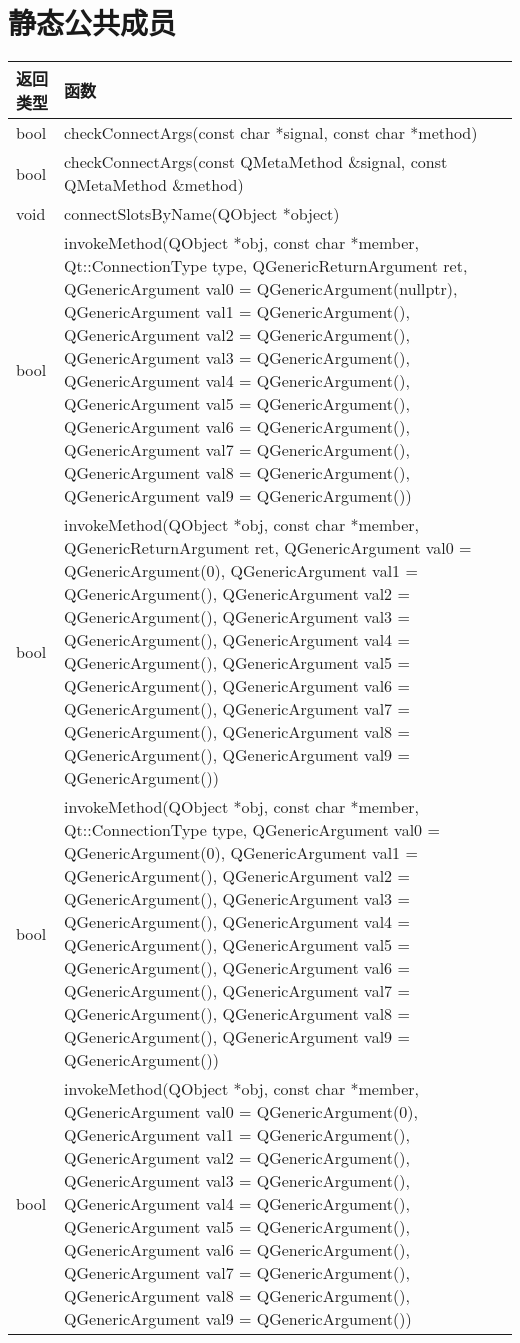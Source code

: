 \section{静态公共成员}

\begin{longtable}[l]{|l|m{28em}|}
\hline
返回类型 &	函数 \\ 
\hline
bool	&checkConnectArgs(const char *signal, const char *method) \\
\hline
bool	&checkConnectArgs(const QMetaMethod \&signal, const QMetaMethod \&method) \\
\hline
void	&connectSlotsByName(QObject *object) \\
\hline
bool	&invokeMethod(QObject *obj, const char *member, Qt::ConnectionType type, QGenericReturnArgument ret, QGenericArgument val0 = QGenericArgument(nullptr), QGenericArgument val1 = QGenericArgument(), QGenericArgument val2 = QGenericArgument(), QGenericArgument val3 = QGenericArgument(), QGenericArgument val4 = QGenericArgument(), QGenericArgument val5 = QGenericArgument(), QGenericArgument val6 = QGenericArgument(), QGenericArgument val7 = QGenericArgument(), QGenericArgument val8 = QGenericArgument(), QGenericArgument val9 = QGenericArgument())\\
\hline
bool	&invokeMethod(QObject *obj, const char *member, QGenericReturnArgument ret, QGenericArgument val0 = QGenericArgument(0), QGenericArgument val1 = QGenericArgument(), QGenericArgument val2 = QGenericArgument(), QGenericArgument val3 = QGenericArgument(), QGenericArgument val4 = QGenericArgument(), QGenericArgument val5 = QGenericArgument(), QGenericArgument val6 = QGenericArgument(), QGenericArgument val7 = QGenericArgument(), QGenericArgument val8 = QGenericArgument(), QGenericArgument val9 = QGenericArgument())\\
\hline
bool	&invokeMethod(QObject *obj, const char *member, Qt::ConnectionType type, QGenericArgument val0 = QGenericArgument(0), QGenericArgument val1 = QGenericArgument(), QGenericArgument val2 = QGenericArgument(), QGenericArgument val3 = QGenericArgument(), QGenericArgument val4 = QGenericArgument(), QGenericArgument val5 = QGenericArgument(), QGenericArgument val6 = QGenericArgument(), QGenericArgument val7 = QGenericArgument(), QGenericArgument val8 = QGenericArgument(), QGenericArgument val9 = QGenericArgument())\\
\hline
bool	&invokeMethod(QObject *obj, const char *member, QGenericArgument val0 = QGenericArgument(0), QGenericArgument val1 = QGenericArgument(), QGenericArgument val2 = QGenericArgument(), QGenericArgument val3 = QGenericArgument(), QGenericArgument val4 = QGenericArgument(), QGenericArgument val5 = QGenericArgument(), QGenericArgument val6 = QGenericArgument(), QGenericArgument val7 = QGenericArgument(), QGenericArgument val8 = QGenericArgument(), QGenericArgument val9 = QGenericArgument())\\

\end{longtable}
